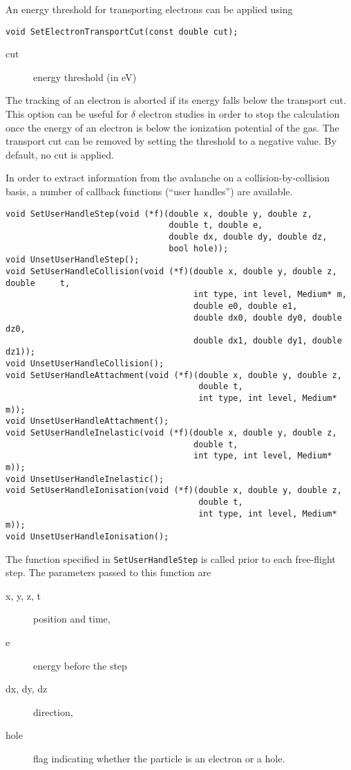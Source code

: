 An energy threshold for transporting electrons can be applied using 
\begin{lstlisting}
void SetElectronTransportCut(const double cut);
\end{lstlisting}
\begin{description}
  \item[cut] energy threshold (in eV)
\end{description}
The tracking of an electron is aborted if its energy falls below the 
transport cut. This option can be useful for \(\delta\) electron studies in 
order to stop the calculation once the energy of an electron 
is below the ionization potential of the gas. 
The transport cut can be removed by setting the threshold to a negative value.
By default, no cut is applied.

In order to extract information from the avalanche on a collision-by-collision basis, a number of callback functions (``user handles'') are available. 
\begin{lstlisting}
void SetUserHandleStep(void (*f)(double x, double y, double z,
                                 double t, double e,
                                 double dx, double dy, double dz,
                                 bool hole));
void UnsetUserHandleStep();
void SetUserHandleCollision(void (*f)(double x, double y, double z, double     t,
                                      int type, int level, Medium* m,
                                      double e0, double e1,
                                      double dx0, double dy0, double dz0,
                                      double dx1, double dy1, double dz1));
void UnsetUserHandleCollision();
void SetUserHandleAttachment(void (*f)(double x, double y, double z,
                                       double t,
                                       int type, int level, Medium* m));
void UnsetUserHandleAttachment();
void SetUserHandleInelastic(void (*f)(double x, double y, double z,
                                      double t,
                                      int type, int level, Medium* m));
void UnsetUserHandleInelastic();
void SetUserHandleIonisation(void (*f)(double x, double y, double z,
                                       double t,
                                       int type, int level, Medium* m));
void UnsetUserHandleIonisation();
\end{lstlisting}
The function specified in \texttt{SetUserHandleStep} is called 
prior to each free-flight step. 
The parameters passed to this function are 
\begin{description}
  \item[x, y, z, t] 
  position and time, 
  \item[e]
  energy before the step
  \item[dx, dy, dz] 
  direction,
  \item[hole]
  flag indicating whether the particle is an electron or a hole.
\end{description}  
